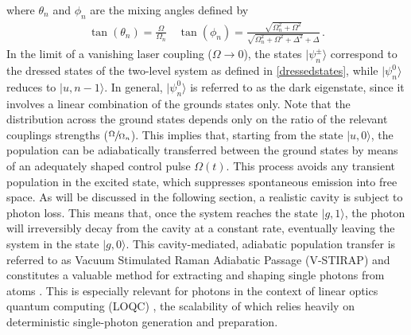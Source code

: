 \documentclass[../Thesis-IJspeert.tex]{subfiles}
\begin{document}
where $\theta_n$ and $\phi_n$ are the mixing angles defined by
\begin{align}
\tan(\theta_n)=\frac{\Omega}{\Omega_n}\quad
\tan(\phi_n) = \frac{\sqrt{\Omega_n^2 + \Omega^2}}{\sqrt{\Omega_n^2 + \Omega^2 + \Delta^2} + \Delta}\,. 
\label{eq:3lvlTripletStatesMixingAngles}
\end{align}
In the limit of a vanishing laser coupling ($\Omega\rightarrow 0 $), the states $\vert \psi ^\pm _n \rangle $ correspond to the dressed states of the two-level system as defined in \autoref{dressedstates}, while $\vert \psi ^0 _n \rangle $ reduces to $ \vert u, n-1\rangle$. In general, $\vert \psi ^0 _n \rangle$ is referred to as the dark eigenstate, since it involves a linear combination of the grounds states only. Note that the distribution across the ground states depends only on the ratio of the relevant couplings strengths ($\sfrac{\Omega}{\Omega_n}$). This implies that, starting from the state $\vert u, 0\rangle$, the population can be adiabatically transferred between the ground states by means of an adequately shaped control pulse $\Omega(t)$. This process avoids any transient population in the excited state, which suppresses spontaneous emission into free space. As will be discussed in the following section, a realistic cavity is subject to photon loss. This means that, once the system reaches the state $ \vert g, 1\rangle $, the photon will irreversibly decay from the cavity at a constant rate, eventually leaving the system in the state $ \vert g, 0\rangle$. This cavity-mediated, adiabatic population transfer is referred to as Vacuum Stimulated Raman Adiabatic Passage (V-STIRAP) and constitutes a valuable method for extracting and shaping single photons from atoms \cite{Kuhn2002,McKeever2004,Brattke2001}. This is especially relevant for photons in the context of linear optics quantum computing (LOQC) \cite{Knill2001,Ralph2001,Kok2007,OBrien2007}, the scalability of which relies heavily on deterministic single-photon generation and preparation.
\end{document}
